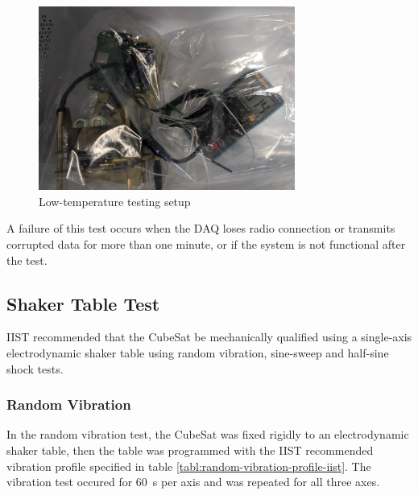 \documentclass{report}
\begin{document}
\begin{figure}[H]
  \centering
  \includegraphics[width=0.75\textwidth]{images/fridge_test.jpg}
  \caption{Low-temperature testing setup}
\end{figure}

A failure of this test occurs when the DAQ loses radio connection or transmits corrupted data for more than one minute, or if the system is not functional after the test.

\subsection{Shaker Table Test}
\label{sec:shaker-table-test}

IIST recommended that the CubeSat be mechanically qualified using a single-axis electrodynamic shaker table using random vibration, sine-sweep and half-sine shock tests.

\subsubsection{Random Vibration}

In the random vibration test, the CubeSat was fixed rigidly to an electrodynamic shaker table, then the table was programmed with the IIST recommended vibration profile specified in table \ref{tabl:random-vibration-profile-iist}. The vibration test occured for \SI{60}{\second} per axis and was repeated for all three axes.
\end{document}
